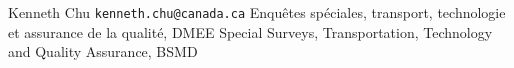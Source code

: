 
\begin{frame}{}

\begin{center}
\vskip 2.5cm
\end{center}

\begin{center}
\vskip 0.5cm
{\Large Kenneth Chu}
\vskip 0.1cm
\texttt{kenneth.chu@canada.ca}
\vskip 0.1cm
{\small Enqu\^{e}tes sp\'{e}ciales, transport, technologie et assurance de la qualit\'{e}, DMEE
\vskip 0.0cm Special Surveys, Transportation, Technology and Quality Assurance, BSMD}
\end{center}

\end{frame}
\normalsize


